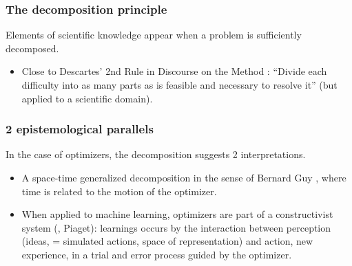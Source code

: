 \documentclass[12pt]{beamer}
\begin{document}

\begin{frame}
\frametitle{The decomposition principle}
\begin{block}{}
Elements of scientific knowledge appear when a problem is sufficiently decomposed.
\end{block}
\begin{itemize}
\item Close to Descartes' 2nd Rule in Discourse on the Method : ``Divide each difficulty into as many parts as is feasible and necessary to resolve it''
(but applied to a scientific domain).
\end{itemize}
\end{frame}

\begin{frame}
\frametitle{2 epistemological parallels}
In the case of optimizers, the decomposition suggests 2 interpretations.
\begin{itemize}
\item A space-time generalized decomposition in the sense of Bernard Guy \cite{guyTempsEspace}, where time is related to the motion of the optimizer.
\item When applied to machine learning, optimizers are part of a constructivist system (\cite{sarkar2016constructivist}, Piaget): learnings occurs by the interaction between perception (ideas, = simulated actions, space of representation) and action, new experience, in a trial and error process guided by the optimizer.
\end{itemize}
\end{frame}
\end{document}
